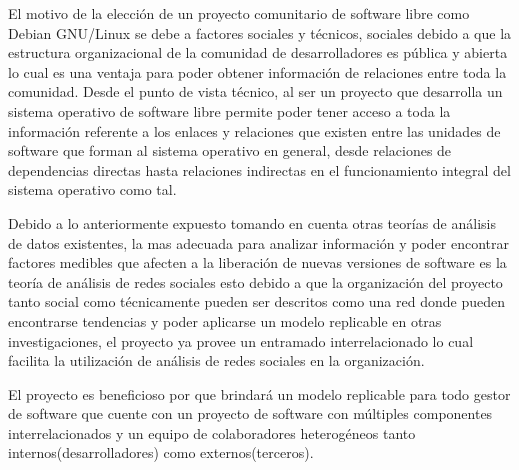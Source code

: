 \documentclass[12pt]{report}
\begin{document}
El motivo de la elección de  un proyecto comunitario de software libre
como Debian GNU/Linux se debe a factores sociales y técnicos, sociales
debido  a  que  la  estructura   organizacional  de  la  comunidad  de
desarrolladores es pública y abierta lo cual es una ventaja para poder
obtener información  de relaciones entre  toda la comunidad.  Desde el
punto de vista  técnico, al ser un proyecto que  desarrolla un sistema
operativo  de software  libre permite  poder  tener acceso  a toda  la
información referente a los enlaces y relaciones que existen entre las
unidades de software que forman al sistema operativo en general, desde
relaciones de dependencias directas  hasta relaciones indirectas en el
funcionamiento integral del sistema operativo como tal.

Debido a lo anteriormente expuesto  tomando en cuenta otras teorías de
análisis  de   datos  existentes,   la  mas  adecuada   para  analizar
información  y poder  encontrar  factores medibles  que  afecten a  la
liberación de nuevas versiones de software es la teoría de análisis de
redes sociales  esto debido a  que la organización del  proyecto tanto
social  como técnicamente  pueden  ser descritos  como  una red  donde
pueden encontrarse  tendencias y poder aplicarse  un modelo replicable
en  otras   investigaciones,  el  proyecto  ya   provee  un  entramado
interrelacionado lo cual facilita la  utilización de análisis de redes
sociales en la organización.

El proyecto es beneficioso por  que brindará un modelo replicable para
todo gestor  de software que  cuente con  un proyecto de  software con
múltiples componentes  interrelacionados y un equipo  de colaboradores
heterogéneos tanto internos(desarrolladores) como externos(terceros).
\end{document}
